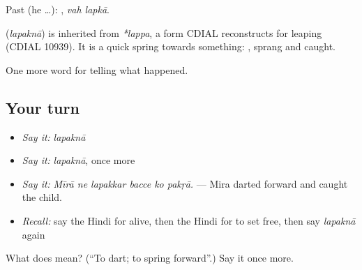 Past (he …):  , \emph{vah lapkā}.

\begin{cousinweb}
\textbf{} (\emph{lapaknā}) is inherited from \emph{*lappa}, a form CDIAL reconstructs for leaping (CDIAL 10939). It is a quick spring towards something: \textbf{ }, sprang and caught.
\end{cousinweb}

\begin{grammarlens}[title={What you've built}]
One more word for telling what happened.
\end{grammarlens}

\subsection*{Your turn}
\begin{itemize}
\raggedright
  \item \emph{Say it:} \emph{lapaknā}
  \item \emph{Say it:} \emph{lapaknā}, once more
  \item \emph{Say it:} \emph{Mīrā ne lapakkar bacce ko pakṛā.} — Mira darted forward and caught the child.
  \item \emph{Recall:} say the Hindi for alive, then the Hindi for to set free, then say \emph{lapaknā} again
\end{itemize}

\begin{tcolorbox}[breakable,colback=teal!4,colframe=teal!35!black,title={Before you move on}]
What does  mean? (\textquotedblleft{}To dart; to spring forward\textquotedblright{}.) Say it once more.
\end{tcolorbox}
